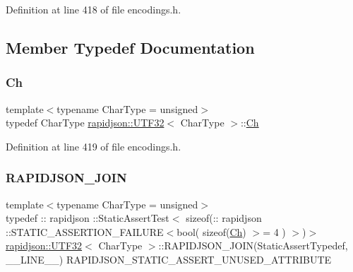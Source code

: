 Definition at line 418 of file encodings.\+h.



\subsection{Member Typedef Documentation}
\mbox{\label{structrapidjson_1_1_u_t_f32_acea97ff3d1b722b88c5faa72cfd4385e}} 
\subsubsection{\texorpdfstring{Ch}{Ch}}
{\footnotesize\ttfamily template$<$typename Char\+Type  = unsigned$>$ \\
typedef Char\+Type \mbox{\hyperlink{structrapidjson_1_1_u_t_f32}{rapidjson\+::\+U\+T\+F32}}$<$ Char\+Type $>$\+::\mbox{\hyperlink{structrapidjson_1_1_u_t_f32_acea97ff3d1b722b88c5faa72cfd4385e}{Ch}}}



Definition at line 419 of file encodings.\+h.

\mbox{\label{structrapidjson_1_1_u_t_f32_a0c4238aed24e3bb908663169bb819364}} 
\subsubsection{\texorpdfstring{RAPIDJSON\_JOIN}{RAPIDJSON\_JOIN}}
{\footnotesize\ttfamily template$<$typename Char\+Type  = unsigned$>$ \\
typedef \+:: rapidjson \+::Static\+Assert\+Test$<$ sizeof(\+:: rapidjson \+::S\+T\+A\+T\+I\+C\+\_\+\+A\+S\+S\+E\+R\+T\+I\+O\+N\+\_\+\+F\+A\+I\+L\+U\+RE$<$bool( sizeof(\mbox{\hyperlink{structrapidjson_1_1_u_t_f32_acea97ff3d1b722b88c5faa72cfd4385e}{Ch}}) $>$= 4 ) $>$)$>$ \mbox{\hyperlink{structrapidjson_1_1_u_t_f32}{rapidjson\+::\+U\+T\+F32}}$<$ Char\+Type $>$\+::R\+A\+P\+I\+D\+J\+S\+O\+N\+\_\+\+J\+O\+IN(Static\+Assert\+Typedef, \+\_\+\+\_\+\+L\+I\+N\+E\+\_\+\+\_\+) R\+A\+P\+I\+D\+J\+S\+O\+N\+\_\+\+S\+T\+A\+T\+I\+C\+\_\+\+A\+S\+S\+E\+R\+T\+\_\+\+U\+N\+U\+S\+E\+D\+\_\+\+A\+T\+T\+R\+I\+B\+U\+TE}



